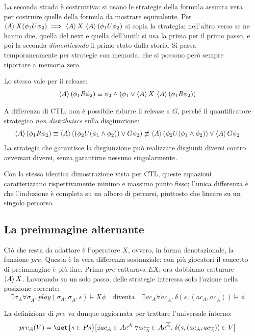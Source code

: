 La seconda strada è costruttiva: si usano le strategie della formula assunta vera per costruire quelle della formula da mostrare equivalente. Per \(\GDia[A] X (\phi_1 U\phi_2) \implies \GDia[A] X\, \GDia[A] (\phi_1 U\phi_2)\) si copia la strategia; nell'altro verso se ne hanno due, quella del next e quella dell'until: si usa la prima per il primo passo, e poi la seconda \emph{dimenticando} il primo stato dalla storia. Si passa temporaneamente per strategie con memoria, che si possono però sempre riportare a memoria zero.

Lo stesso vale per il release:
\[\GDia[A] (\phi_1 R \phi_2) \equiv \phi_2 \land (\phi_1 \lor \GDia[A] X\, \GDia[A] (\phi_1 R\phi_2))\]

\begin{warning}{}
  A differenza di CTL, non è possibile ridurre il release a \(G\), perché il quantificatore strategico \emph{non distribuisce} sulla disgiunzione:
  \[\GDia[A] (\phi_1 R \phi_2) \equiv \GDia[A] \left((\phi_2 U (\phi_1 \land \phi_2)) \lor G \phi_2\right) \not\equiv \GDia[A] (\phi_2 U (\phi_1 \land \phi_2)) \lor \GDia[A] G \phi_2\]
  La strategia che garantisce la disgiunzione può realizzare disgiunti diversi contro avversari diversi, senza garantirne nessuno singolarmente.
\end{warning}

Con la stessa identica dimostrazione vista per CTL, queste equazioni caratterizzano rispettivamente minimo e massimo punto fisso; l'unica differenza è che l'induzione è completa su un albero di percorsi, piuttosto che lineare su un singolo percorso.

\subsection{La preimmagine alternante}

Ciò che resta da adattare è l'operatore \(X\), ovvero, in forma denotazionale, la funzione \(pre\). Questa è la vera differenza sostanziale: con più giocatori il concetto di preimmagine è più fine. Prima \(pre\) catturava \(EX\); ora dobbiamo catturare \(\GDia[A]X\). Lavorando su un solo passo, delle strategie interessa solo l'azione nella posizione corrente:
\[\exists \sigma_A \forall \sigma_{\overline{A}}.\ play(\sigma_A,\sigma_{\overline{A}},s) \models X\phi
  \quad\text{diventa}\quad
  \exists {ac}_{A} \forall {ac}_{\overline{A}}.\ \delta(s, ({ac}_A, {ac}_{\overline{A}})) \models \phi\]

La definizione di \(pre\) va dunque aggiornata per trattare l'universale interno:
\[pre_A(V) = \set{s\in Ps}[\exists {ac}_{A} \in Ac^A\ \forall {ac}_{\overline{A}} \in Ac^{\overline{A}}.\ \delta(s, ({ac}_A, {ac}_{\overline{A}})) \in V]\]

